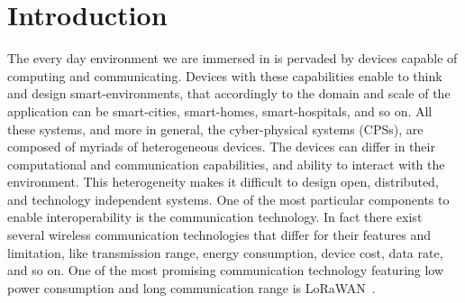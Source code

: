 \chapter{Introduction}
\label{chap:introduction}
The every day environment we are immersed in is pervaded by devices capable of computing and communicating.
Devices with these capabilities enable to think and design smart-environments, that accordingly to the domain and scale of the application can be smart-cities, smart-homes, smart-hospitals, and so on.
All these systems, and more in general, the cyber-physical systems (CPSs), are composed of myriads of heterogeneous devices.
The devices can differ in their computational and communication capabilities, and ability to interact with the environment.
This heterogeneity makes it difficult to design open, distributed, and technology independent systems. 
One of the most particular components to enable interoperability is the communication technology.
In fact there exist several wireless communication technologies that differ for their features and limitation, like transmission range, energy consumption, device cost, data rate, and so on.
One of the most promising communication technology featuring low power consumption and long communication range is \mbox{LoRaWAN}~\cite{loraalliancetechnicalcommittee2020}.

